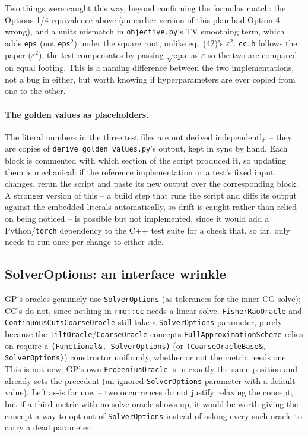 \documentclass[11pt]{article}
\begin{document}
Two things were caught this way, beyond confirming the formulas match: the Options 1/4
equivalence above (an earlier version of this plan had Option 4 wrong), and a units
mismatch in \texttt{objective.py}'s TV smoothing term, which adds \texttt{eps} (not
\texttt{eps}$^2$) under the square root, unlike eq.~(42)'s $\varepsilon^2$. \texttt{cc.h}
follows the paper ($\varepsilon^2$); the test compensates by passing $\sqrt{\texttt{eps}}$
as $\varepsilon$ so the two are compared on equal footing. This is a naming difference
between the two implementations, not a bug in either, but worth knowing if hyperparameters
are ever copied from one to the other.

\paragraph{The golden values as placeholders.} The literal numbers in the three test files
are not derived independently -- they are copies of \texttt{derive\_golden\_values.py}'s
output, kept in sync by hand. Each block is commented with which section of the script
produced it, so updating them is mechanical: if the reference implementation or a test's
fixed input changes, rerun the script and paste its new output over the corresponding
block. A stronger version of this -- a build step that runs the script and diffs its
output against the embedded literals automatically, so drift is caught rather than relied
on being noticed -- is possible but not implemented, since it would add a Python/\texttt{torch}
dependency to the C++ test suite for a check that, so far, only needs to run once per
change to either side.

\subsection{SolverOptions: an interface wrinkle}
\label{sec:solveroptions}

GP's oracles genuinely use \texttt{SolverOptions} (as tolerances for the inner CG solve);
CC's do not, since nothing in \texttt{rmo::cc} needs a linear solve. \texttt{FisherRaoOracle}
and \texttt{ContinuousCutsCoarseOracle} still take a \texttt{SolverOptions} parameter,
purely because the \texttt{TiltOracle}/\texttt{CoarseOracle} concepts
\texttt{FullApproximationScheme} relies on require a
\texttt{(Functional\&, SolverOptions)} (or \texttt{(CoarseOracleBase\&, SolverOptions)})
constructor uniformly, whether or not the metric needs one. This is not new: GP's own
\texttt{FrobeniusOracle} is in exactly the same position and already sets the precedent
(an ignored \texttt{SolverOptions} parameter with a default value). Left as-is for now --
two occurrences do not justify relaxing the concept, but if a third metric-with-no-solve
oracle shows up, it would be worth giving the concept a way to opt out of
\texttt{SolverOptions} instead of asking every such oracle to carry a dead parameter.
\end{document}
